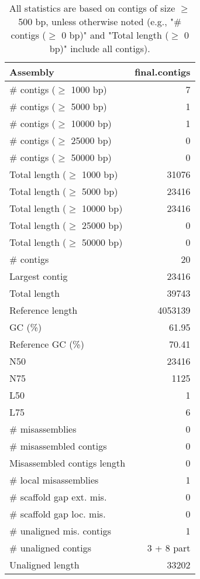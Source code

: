 \documentclass[12pt,a4paper]{article}
\begin{document}
\begin{table}[ht]
\begin{center}
\caption{All statistics are based on contigs of size $\geq$ 500 bp, unless otherwise noted (e.g., "\# contigs ($\geq$ 0 bp)" and "Total length ($\geq$ 0 bp)" include all contigs).}
\begin{tabular}{|l*{1}{|r}|}
\hline
Assembly & final.contigs \\ \hline
\# contigs ($\geq$ 1000 bp) & 7 \\ \hline
\# contigs ($\geq$ 5000 bp) & 1 \\ \hline
\# contigs ($\geq$ 10000 bp) & 1 \\ \hline
\# contigs ($\geq$ 25000 bp) & 0 \\ \hline
\# contigs ($\geq$ 50000 bp) & 0 \\ \hline
Total length ($\geq$ 1000 bp) & 31076 \\ \hline
Total length ($\geq$ 5000 bp) & 23416 \\ \hline
Total length ($\geq$ 10000 bp) & 23416 \\ \hline
Total length ($\geq$ 25000 bp) & 0 \\ \hline
Total length ($\geq$ 50000 bp) & 0 \\ \hline
\# contigs & 20 \\ \hline
Largest contig & 23416 \\ \hline
Total length & 39743 \\ \hline
Reference length & 4053139 \\ \hline
GC (\%) & 61.95 \\ \hline
Reference GC (\%) & 70.41 \\ \hline
N50 & 23416 \\ \hline
N75 & 1125 \\ \hline
L50 & 1 \\ \hline
L75 & 6 \\ \hline
\# misassemblies & 0 \\ \hline
\# misassembled contigs & 0 \\ \hline
Misassembled contigs length & 0 \\ \hline
\# local misassemblies & 1 \\ \hline
\# scaffold gap ext. mis. & 0 \\ \hline
\# scaffold gap loc. mis. & 0 \\ \hline
\# unaligned mis. contigs & 1 \\ \hline
\# unaligned contigs & 3 + 8 part \\ \hline
Unaligned length & 33202 \\ \hline

\end{tabular}
\end{center}
\end{table}
\end{document}
